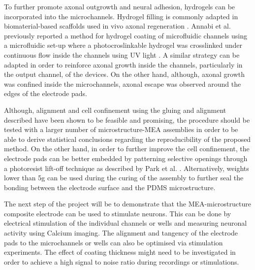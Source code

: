 \quad To further promote axonal outgrowth and neural adhesion, hydrogels can be incorporated into the microchannels. Hydrogel filling is commonly adapted in biomaterial-based scaffolds used in vivo axonal regeneration \cite{struzyna2017anatomically}. Annabi et al. previously reported a method for hydrogel coating of microfluidic channels using a microfluidic set-up where a photocroslinkable hydrogel was crosslinked under continuous flow inside the channels using UV light \cite{annabi2013hydrogel}. A similar strategy can be adapted in order to reinforce axonal growth inside the channels, particularly in the output channel, of the devices. On the other hand, although, axonal growth was confined inside the microchannels, axonal escape was observed around the edges of the electrode pads. 

\quad Although, alignment and cell confinement using the gluing and alignment described have been shown to be feasible and promising, the procedure should be tested with a larger number of microstructure-MEA assemblies in order to be able to derive statistical conclusions regarding the reproducibility of the proposed method. On the other hand, in order to further improve the cell confinement, the electrode pads can be better embedded by patterning selective openings through a photoresist lift-off technique as described by Park et al. \cite{park2009micropatterning}. Alternatively, weights lower than 5g can be used during the curing of the assembly to further seal the bonding between the electrode surface and the PDMS microstructure.

\quad The next step of the project will be to demonstrate that the MEA-microstructure composite electrode can be used to stimulate neurons. This can be done by electrical stimulation of the individual channels or wells and measuring neuronal activity using Calcium imaging. The alignment and tangency of the electrode pads to the microchannels or wells can also be optimised via stimulation experiments. The effect of coating thickness might need to be investigated in order to achieve a high signal to noise ratio during recordings or stimulations. 


